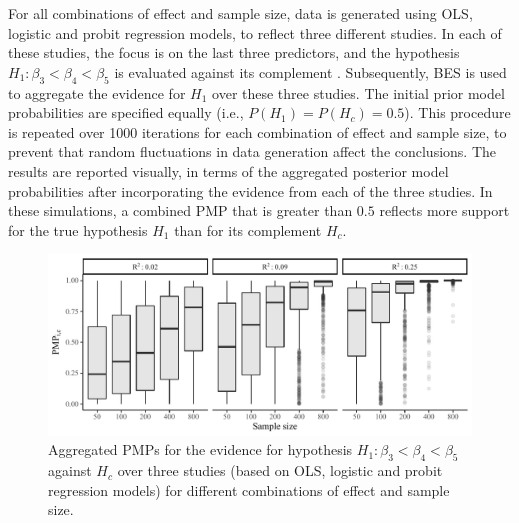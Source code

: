\documentclass[11pt,reqno]{article}
\begin{document}
For all combinations of effect and sample size, data is generated using OLS, logistic and probit regression models, to reflect three different studies.
In each of these studies, the focus is on the last three predictors, and the hypothesis $H_1: \beta_3 < \beta_4 < \beta_5$ is evaluated against its complement \autocite[using the \texttt{BF()} function from the \texttt{R}-package \texttt{BFpack}, with default (prior) settings;][Version 1.0.0]{BFpack}.
Subsequently, BES is used to aggregate the evidence for $H_1$ over these three studies.
The initial prior model probabilities are specified equally (i.e., $P(H_1) = P(H_{c}) = 0.5$).
This procedure is repeated over 1000 iterations for each combination of effect and sample size, to prevent that random fluctuations in data generation affect the conclusions.
The results are reported visually, in terms of the aggregated posterior model probabilities after incorporating the evidence from each of the three studies.
In these simulations, a combined PMP that is greater than $0.5$ reflects more support for the true hypothesis $H_1$ than for its complement $H_c$.

\begin{figure}[ht]
   \centerline{\includegraphics[width=15cm]{r-files-bes-klugkist-volker-2022/Figures/sim1_box}}
 \caption{Aggregated PMPs for the evidence for hypothesis $H_1: \beta_3 < \beta_4 < \beta_5$ against $H_c$ over three studies (based on OLS, logistic and probit regression models) for different combinations of effect and sample size.}
 \label{sim1_box}
\end{figure}
\end{document}
